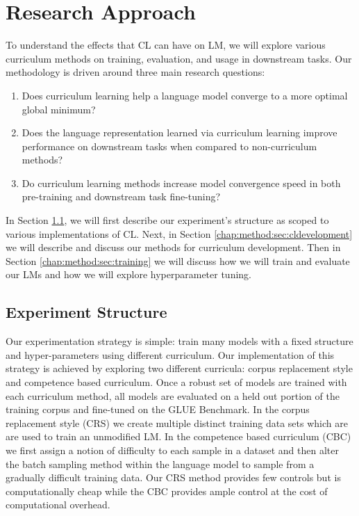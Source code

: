 \chapter{Research Approach}
\label{chap:method}
To understand the effects that CL can have on LM, we will explore various curriculum methods on training, evaluation, and usage in downstream tasks. 
Our methodology is driven around three main research questions:
\begin{enumerate}
\item Does curriculum learning help a language model converge to a more optimal global minimum? 
\item Does the language representation learned via curriculum learning improve performance on downstream tasks when compared to non-curriculum methods?
\item  Do curriculum learning methods increase model convergence speed in both pre-training and downstream task fine-tuning?
\end{enumerate}
In Section \ref{chap:method:sec:structure}, we will first describe our experiment's structure as scoped to various implementations of CL. Next, in Section \ref{chap:method:sec:cldevelopment} we will describe and discuss our methods for curriculum development. Then in Section \ref{chap:method:sec:training} we will discuss how we will train and evaluate our LMs and how we will explore hyperparameter tuning.
\section{Experiment Structure}
\label{chap:method:sec:structure}
Our experimentation strategy is simple: train many models with a fixed structure and hyper-parameters using different curriculum. Our implementation of this strategy is achieved by exploring two different curricula: corpus replacement style and competence based curriculum. Once a robust set of models are trained with each curriculum method, all models are evaluated on a held out portion of the training corpus and fine-tuned on the GLUE Benchmark. In the corpus replacement style (CRS) we create multiple distinct training data sets which are are used to train an unmodified LM. In the competence based curriculum (CBC) we first assign a notion of difficulty to each sample in a dataset and then alter the batch sampling method within the language model to sample from a gradually difficult training data. Our CRS method provides few controls but is computationally cheap while the CBC provides ample control at the cost of computational overhead. \\
